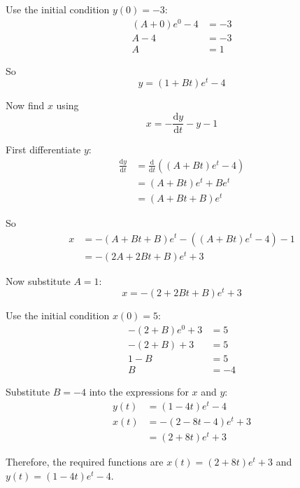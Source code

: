 \documentclass[leqno]{article}
\begin{document}
\begin{enumerate}[
  label=\textbf{\arabic*.},
  leftmargin=*,
  topsep=0pt,
  partopsep=0pt,
  parsep=0pt
]
\begin{djsSolution}
Use the initial condition \(y(0)=-3\):
\begin{align*}
(A+0)e^0-4&=-3 \\
A-4&=-3 \\
A&=1
\end{align*}

So
\[
y=(1+Bt)e^t-4
\]

Now find \(x\) using
\[
x=-\frac{\mathrm{d}y}{\mathrm{d}t}-y-1
\]

First differentiate \(y\):
\begin{align*}
\frac{\mathrm{d}y}{\mathrm{d}t}
&=\frac{\mathrm{d}}{\mathrm{d}t}\left((A+Bt)e^t-4\right) \\
&=(A+Bt)e^t+Be^t \\
&=(A+Bt+B)e^t
\end{align*}

So
\begin{align*}
x
&=-(A+Bt+B)e^t-\left((A+Bt)e^t-4\right)-1 \\
&=-(2A+2Bt+B)e^t+3
\end{align*}

Now substitute \(A=1\):
\[
x=-(2+2Bt+B)e^t+3
\]

Use the initial condition \(x(0)=5\):
\begin{align*}
-(2+B)e^0+3&=5 \\
-(2+B)+3&=5 \\
1-B&=5 \\
B&=-4
\end{align*}

Substitute \(B=-4\) into the expressions for \(x\) and \(y\):
\begin{align*}
y(t)&=(1-4t)e^t-4 \\
x(t)&=-(2-8t-4)e^t+3 \\
&=(2+8t)e^t+3
\end{align*}

Therefore, the required functions are \(x(t)=(2+8t)e^t+3\) and \(y(t)=(1-4t)e^t-4\).
\end{djsSolution}


\newpage

\questionitem


\end{enumerate}
\end{document}
